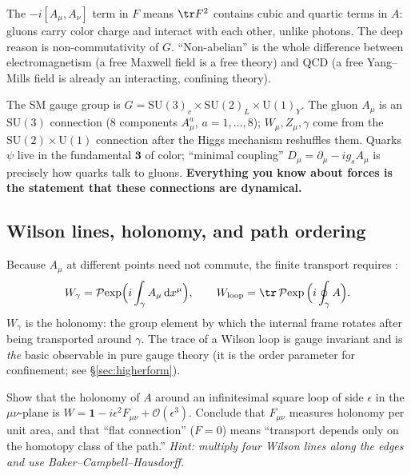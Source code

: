 \documentclass[11pt]{article}
\newcommand{\dd}{\mathrm{d}}                 %
\newcommand{\Pexp}{\mathcal{P}\!\exp}        %
\newcommand{\Uone}{\mathrm{U}(1)}
\begin{document}
\begin{iintuition}
The $-i[A_\mu,A_\nu]$ term in $F$ means $\tr F^2$ contains cubic and quartic terms in
$A$: gluons carry color charge and interact with each other, unlike photons. The deep
reason is non-commutativity of $G$. ``Non-abelian'' is the whole difference between
electromagnetism (a free Maxwell field is a free theory) and QCD (a free Yang--Mills
field is already an interacting, confining theory).
\end{iintuition}

\begin{eexample}
The SM gauge group is $G = \mathrm{SU}(3)_c\times\mathrm{SU}(2)_L\times\Uone_Y$. The
gluon $A_\mu$ is an $\mathrm{SU}(3)$ connection (8 components $A_\mu^a$, $a=1,\dots,8$);
$W_\mu, Z_\mu, \gamma$ come from the $\mathrm{SU}(2)\times\Uone$ connection after the
Higgs mechanism reshuffles them. Quarks $\psi$ live in the fundamental $\mathbf 3$ of
color; ``minimal coupling'' $D_\mu = \partial_\mu - ig_s A_\mu$ is precisely how quarks
talk to gluons. \textbf{Everything you know about forces is the statement that these
connections are dynamical.}
\end{eexample}

\subsection{Wilson lines, holonomy, and path ordering}

Because $A_\mu$ at different points need not commute, the finite transport requires
:
\[
W_\gamma = \Pexp\!\Big(i\int_\gamma A_\mu\,\dd x^\mu\Big),
\qquad
W_{\text{loop}} = \tr\, \Pexp\Big(i\oint_\gamma A\Big).
\]
$W_\gamma$ is the holonomy: the group element by which the internal frame rotates after
being transported around $\gamma$. The trace of a Wilson loop is gauge invariant and is
\emph{the} basic observable in pure gauge theory (it is the order parameter for
confinement; see \S\ref{sec:higherform}).

\begin{xca}
Show that the holonomy of $A$ around an infinitesimal square loop of side $\epsilon$ in
the $\mu\nu$-plane is $W = \mathbf{1} - i\epsilon^2 F_{\mu\nu} + \mathcal{O}(\epsilon^3)$.
Conclude that $F_{\mu\nu}$ measures holonomy per unit area, and that ``flat connection''
($F=0$) means ``transport depends only on the homotopy class of the path.'' \emph{Hint:
multiply four Wilson lines along the edges and use Baker--Campbell--Hausdorff.}
\end{xca}
\end{document}
